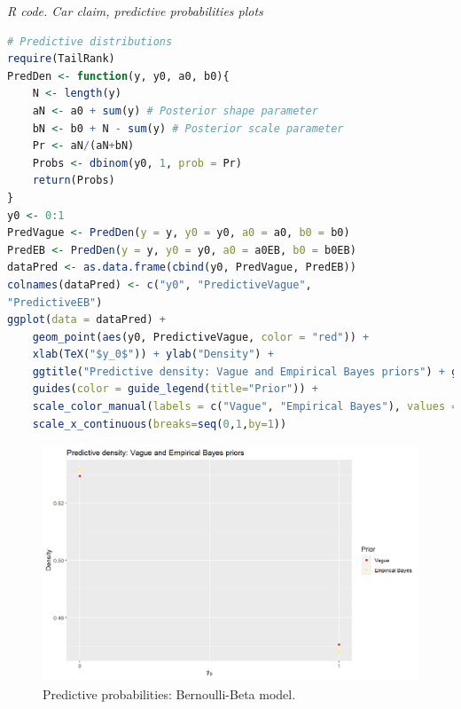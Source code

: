 \begin{enumerate}[leftmargin=*]
\begin{tcolorbox}[enhanced,width=4.67in,center upper,
	fontupper=\large\bfseries,drop shadow southwest,sharp corners]
	\textit{R code. Car claim, predictive probabilities plots}
\begin{VF}
\begin{lstlisting}[language=R]
# Predictive distributions
require(TailRank)
PredDen <- function(y, y0, a0, b0){
	N <- length(y)
	aN <- a0 + sum(y) # Posterior shape parameter
	bN <- b0 + N - sum(y) # Posterior scale parameter
	Pr <- aN/(aN+bN)
	Probs <- dbinom(y0, 1, prob = Pr)
	return(Probs)
}
y0 <- 0:1
PredVague <- PredDen(y = y, y0 = y0, a0 = a0, b0 = b0)
PredEB <- PredDen(y = y, y0 = y0, a0 = a0EB, b0 = b0EB)
dataPred <- as.data.frame(cbind(y0, PredVague, PredEB))
colnames(dataPred) <- c("y0", "PredictiveVague", 
"PredictiveEB")
ggplot(data = dataPred) + 
	geom_point(aes(y0, PredictiveVague, color = "red")) +  
	xlab(TeX("$y_0$")) + ylab("Density") +
	ggtitle("Predictive density: Vague and Empirical Bayes priors") + geom_point(aes(y0, PredictiveEB, color = "yellow")) +
	guides(color = guide_legend(title="Prior")) +
	scale_color_manual(labels = c("Vague", "Empirical Bayes"), values = c("red", "yellow")) +
	scale_x_continuous(breaks=seq(0,1,by=1))
\end{lstlisting}
\end{VF}
\end{tcolorbox}

\begin{figure}[!h]
	\includegraphics[width=340pt, height=200pt]{Chapters/chapter1/figures/predictive.png}
	\caption[List of figure caption goes here]{Predictive probabilities: Bernoulli-Beta model.}\label{fig13}
\end{figure}


\end{enumerate}
